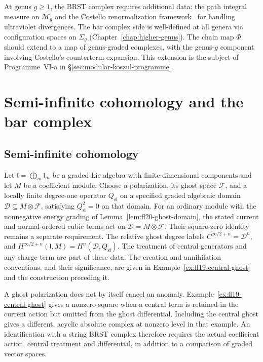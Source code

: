 \begin{remark}
\label{rem:brst-bar-higher-genus}
At genus $g \geq 1$, the BRST complex requires additional data:
the path integral measure on $\overline{\mathcal{M}}_g$ and the
Costello renormalization framework~\cite{costello-renormalization} for handling
ultraviolet divergences.  The bar complex side is well-defined at
all genera via configuration spaces on $\Sigma_g$
(Chapter~\ref{chap:higher-genus}).  The chain map $\Phi$ should
extend to a map of genus-graded complexes, with the genus-$g$
component involving Costello's counterterm expansion.  This
extension is the subject of Programme~VI-a in
\S\ref{sec:modular-koszul-programme}.
\end{remark}

\section{Semi-infinite cohomology and the bar complex}
\label{sec:semi-infinite-bar}

\subsection{Semi-infinite cohomology}

\begin{definition}
\label{def:semi-infinite-cohomology}
Let $\mathfrak l=\bigoplus_m\mathfrak l_m$ be a graded Lie algebra with finite-dimensional components and let $M$ be a coefficient module.
Choose a polarization, its ghost space $\mathcal F$, and a locally finite degree-one operator $Q_{\mathrm{si}}$ on a specified graded algebraic domain $\mathcal D\subseteq M\otimes\mathcal F$, satisfying $Q_{\mathrm{si}}^2=0$ on that domain.
For an ordinary module with the nonnegative energy grading of Lemma~\ref{lem:fl20-ghost-domain}, the stated current and normal-ordered cubic terms act on $\mathcal D=M\otimes\mathcal F$.
Their square-zero identity remains a separate requirement.
The relative ghost degree labels $C^{\infty/2+n}=\mathcal D^n$, and
$H^{\infty/2+n}(\mathfrak l,M)=H^n(\mathcal D,Q_{\mathrm{si}})$.
The treatment of central generators and any charge term are part of these data.
The creation and annihilation conventions, and their significance, are given in Example~\ref{ex:fl19-central-ghost} and the construction preceding it.
\end{definition}

\begin{remark}
\label{rem:semi-infinite-vs-brst}
A ghost polarization does not by itself cancel an anomaly.
Example~\ref{ex:fl19-central-ghost} gives a nonzero square when a central term is retained in the current action but omitted from the ghost differential.
Including the central ghost gives a different, acyclic absolute complex at nonzero level in that example.
An identification with a string BRST complex therefore requires the actual coefficient action, central treatment and differential, in addition to a comparison of graded vector spaces.
\end{remark}

